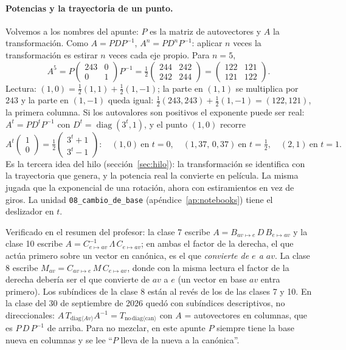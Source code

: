 \paragraph{Potencias y la trayectoria de un punto.} Volvemos a los nombres del apunte:
\(P\) es la matriz de autovectores y \(A\) la transformación. Como \(A=PDP^{-1}\),
\(A^n=PD^nP^{-1}\): aplicar \(n\) veces la transformación es estirar \(n\) veces cada eje
propio. Para \(n=5\),
\[
  A^5=P\begin{pmatrix}243&0\\0&1\end{pmatrix}P^{-1}
  =\tfrac12\begin{pmatrix}244&242\\242&244\end{pmatrix}
  =\begin{pmatrix}122&121\\121&122\end{pmatrix}.
\]
Lectura: \((1,0)=\tfrac12(1,1)+\tfrac12(1,-1)\); la parte en \((1,1)\) se multiplica por
\(243\) y la parte en \((1,-1)\) queda igual: \(\tfrac12(243,243)+\tfrac12(1,-1)=(122,121)\),
la primera columna. Si los autovalores son positivos el exponente puede ser real:
\(A^t=PD^tP^{-1}\) con \(D^t=\operatorname{diag}(3^t,1)\), y el punto \((1,0)\) recorre
\[
  A^t\begin{pmatrix}1\\0\end{pmatrix}=\tfrac12\begin{pmatrix}3^t+1\\3^t-1\end{pmatrix}:
  \quad(1,0)\ \text{en } t=0,\quad(1{,}37,\,0{,}37)\ \text{en } t=\tfrac12,\quad(2,1)\ \text{en } t=1 .
\]
Es la tercera idea del hilo (sección~\ref{sec:hilo}): la transformación se identifica con
la trayectoria que genera, y la potencia real la convierte en película. La misma jugada que
la exponencial de una rotación, ahora con estiramientos en vez de giros. La unidad
\texttt{08\_cambio\_de\_base} (apéndice~\ref{ap:notebooks}) tiene el deslizador en \(t\).

\begin{atencion}
Verificado en el resumen del profesor: la clase 7 escribe
\(A=B_{av\mapsto e}\,D\,B_{e\mapsto av}\) y la clase 10 escribe
\(A=C^{-1}_{e\mapsto av}\,\Lambda\,C_{e\mapsto av}\); en ambas el factor de la derecha,
el que actúa primero sobre un vector en canónica, es el que \emph{convierte de \(e\) a
\(av\)}. La clase 8 escribe \(M_{av}=C_{av\mapsto e}\,M\,C_{e\mapsto av}\), donde con la
misma lectura el factor de la derecha debería ser el que convierte de \(av\) a \(e\)
(un vector en base \(av\) entra primero). Los subíndices de la clase 8 están al revés de
los de las clases 7 y 10. En la clase del 30 de septiembre de 2026 quedó con subíndices
descriptivos, no direccionales:
\(A\,T_{\mathrm{diag}\langle Av\rangle}A^{-1}=T_{\mathrm{no\,diag}\langle\mathrm{can}\rangle}\)
con \(A\) = autovectores en columnas, que es \(P\,D\,P^{-1}\) de arriba. Para no mezclar, en este apunte \(P\) siempre tiene la base
nueva en columnas y se lee ``\(P\) lleva de la nueva a la canónica''.
\end{atencion}

